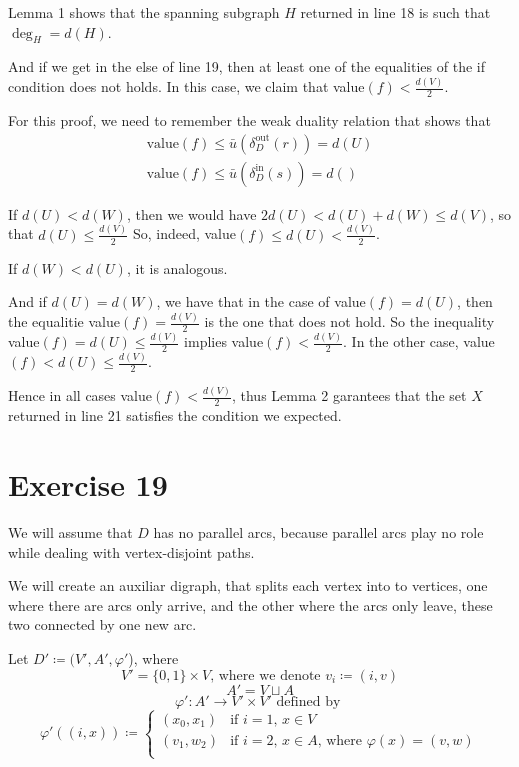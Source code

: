 \documentclass[a4paper,10pt, leqno]{article}
\theoremstyle{definition}
\def\blankpage{%
      \null%
      \clearpage}
\begin{document}
Lemma 1 shows that the spanning subgraph $H$ returned in line 18 is such that $\deg_H = d(H)$.

And if we get in the else of line 19, then at least one of the equalities of the if condition does not holds. In this case, we claim that value$(f) < \frac{d(V)}{2}$.

For this proof, we need to remember the weak duality relation that shows that 
\begin{align*}
\tag{11.15}
\text{value}(f) \leq \bar{u}(\delta_D^{\text{out}}(r)) = d(U) \\
\tag{11.16}
\text{value}(f) \leq \bar{u}(\delta_D^{\text{in}}(s)) = d() 
\end{align*}

If $d(U) < d(W)$, then we would have $2d(U) < d(U) + d(W) \leq d(V)$, so that $d(U) \leq \frac{d(V)}{2}$
So, indeed, value$(f) \leq d(U) < \frac{d(V)}{2}$.

If $d(W) < d(U)$, it is analogous.

And if $d(U) = d(W)$, we have that in the case of value$(f) = d(U)$, then the equalitie value$(f) = \frac{d(V)}{2}$ is the one that does not hold. So the inequality value$(f) = d(U) \leq \frac{d(V)}{2}
$ implies value$(f) < \frac{d(V)}{2}$.
In the other case, value$(f) < d(U) \leq \frac{d(V)}{2}$.

Hence in all cases value$(f) < \frac{d(V)}{2}$, thus Lemma 2 garantees that the set $X$ returned in line 21 satisfies the condition we expected.

\blankpage

\section*{Exercise 19}

We will assume that $D$ has no parallel arcs, because parallel arcs play no role while dealing with vertex-disjoint paths.

We will create an auxiliar digraph, that splits each vertex into to vertices, one where there are arcs only arrive, and the other where the arcs only leave, these two connected by one new arc.

Let $D' \coloneqq (V', A', \varphi'$), where
$$ V' = \{0, 1\} \times V \text{, where we denote } v_i \coloneqq (i, v)$$
$$ A' = V \sqcup A $$
$$ \varphi' : A' \to V' \times V' \text{ defined by } $$
$$ \varphi'((i, x)) \coloneqq 
\left\{
	\begin{array}{ll}
		(x_0, x_1) & \mbox{if } i = 1 \text{, } x \in V \\
		(v_1, w_2) & \mbox{if } i = 2 \text{, } x \in A \text{, where } \varphi(x) = (v, w) \\
	\end{array}
\right. 
$$
\end{document}
